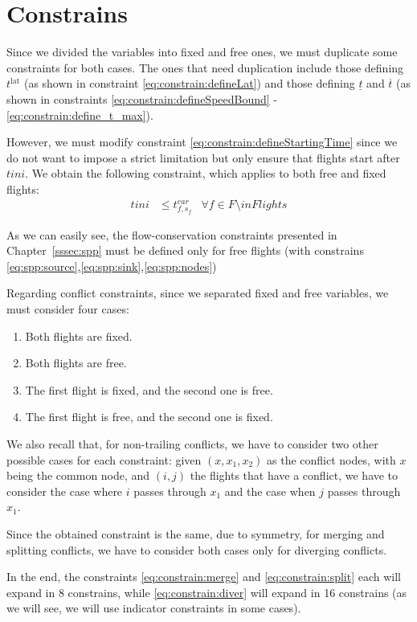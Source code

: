 \documentclass[../thesis.tex]{subfiles}
\begin{document}
\section{Constrains}
Since we divided the variables into fixed and free ones, we must duplicate some constraints for both cases.  
The ones that need duplication include those defining $t^\text{lat}$ (as shown in constraint \ref{eq:constrain:defineLat}) and those defining $\underline t$ and $\overline t$ (as shown in constraints \ref{eq:constrain:defineSpeedBound} - \ref{eq:constrain:define_t_max}).  

However, we must modify constraint \ref{eq:constrain:defineStartingTime} since we do not want to impose a strict limitation but only ensure that flights start after $tini$.  
We obtain the following constraint, which applies to both free and fixed flights:  
\begin{align}\label{eq:constrain:MercedesStart}
tini &\leq t^{ear}_{f,s_f} &\forall f \in F \setminus inFlights
\end{align}  

As we can easily see, the flow-conservation constraints presented in Chapter~\ref{sssec:spp} must be defined only for free flights (with constrains \eqref{eq:spp:source},\eqref{eq:spp:sink},\eqref{eq:spp:nodes})

Regarding conflict constraints, since we separated fixed and free variables, we must consider four cases:  
\begin{enumerate}
    \item Both flights are fixed.
    \item Both flights are free.
    \item The first flight is fixed, and the second one is free.
    \item The first flight is free, and the second one is fixed.
\end{enumerate}  

We also recall that, for non-trailing conflicts, we have to consider two other possible cases for each constraint: given $(x,x_1,x_2)$ as the conflict nodes, with $x$ being the common node, and $(i,j)$ the flights that have a conflict, we have to consider the case where $i$ passes through $x_1$ and the case when $j$ passes through $x_1$.

Since the obtained constraint is the same, due to symmetry, for merging and splitting conflicts, we have to consider both cases only for diverging conflicts.

In the end, the constraints \ref{eq:constrain:merge} and \ref{eq:constrain:split} each will expand in 8 constrains, while \ref{eq:constrain:diver} will expand in 16 constrains (as we will see, we will use indicator constraints in some cases).
\end{document}

